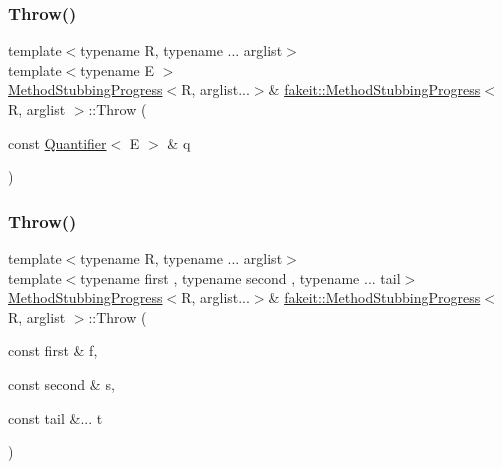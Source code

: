 \mbox{\label{structfakeit_1_1MethodStubbingProgress_a93c74210adfc0ec4662aff15f78834c7}} 
\subsubsection{\texorpdfstring{Throw()}{Throw()}\hspace{0.1cm}{\footnotesize\ttfamily [19/27]}}
{\footnotesize\ttfamily template$<$typename R, typename ... arglist$>$ \\
template$<$typename E $>$ \\
\mbox{\hyperlink{structfakeit_1_1MethodStubbingProgress}{Method\+Stubbing\+Progress}}$<$R, arglist...$>$\& \mbox{\hyperlink{structfakeit_1_1MethodStubbingProgress}{fakeit\+::\+Method\+Stubbing\+Progress}}$<$ R, arglist $>$\+::Throw (\begin{DoxyParamCaption}\item[{const \mbox{\hyperlink{structfakeit_1_1Quantifier}{Quantifier}}$<$ E $>$ \&}]{q }\end{DoxyParamCaption})\hspace{0.3cm}{\ttfamily [inline]}}

\mbox{\label{structfakeit_1_1MethodStubbingProgress_a516a0ade529c61e4ab6df1bf47f3f1b2}} 
\subsubsection{\texorpdfstring{Throw()}{Throw()}\hspace{0.1cm}{\footnotesize\ttfamily [20/27]}}
{\footnotesize\ttfamily template$<$typename R, typename ... arglist$>$ \\
template$<$typename first , typename second , typename ... tail$>$ \\
\mbox{\hyperlink{structfakeit_1_1MethodStubbingProgress}{Method\+Stubbing\+Progress}}$<$R, arglist...$>$\& \mbox{\hyperlink{structfakeit_1_1MethodStubbingProgress}{fakeit\+::\+Method\+Stubbing\+Progress}}$<$ R, arglist $>$\+::Throw (\begin{DoxyParamCaption}\item[{const first \&}]{f,  }\item[{const second \&}]{s,  }\item[{const tail \&...}]{t }\end{DoxyParamCaption})\hspace{0.3cm}{\ttfamily [inline]}}

